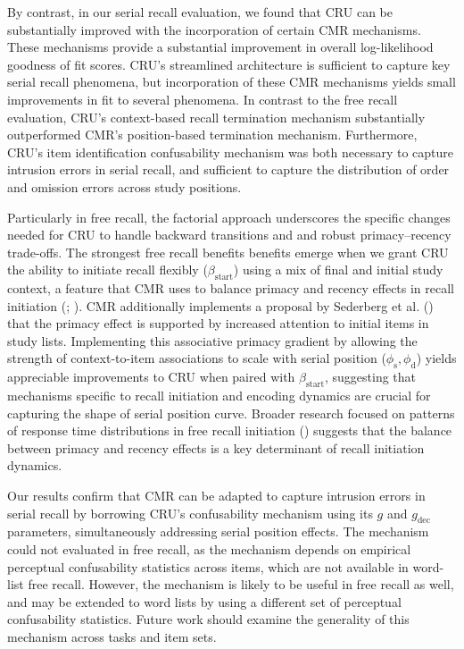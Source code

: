 \documentclass[
  man,
  floatsintext,
  longtable,
  nolmodern,
  notxfonts,
  notimes,
  draftfirst,
  colorlinks=true,linkcolor=blue,citecolor=blue,urlcolor=blue]{apa7}
\begin{document}
By contrast, in our serial recall evaluation, we found that CRU can be
substantially improved with the incorporation of certain CMR mechanisms.
These mechanisms provide a substantial improvement in overall
log-likelihood goodness of fit scores. CRU's streamlined architecture is
sufficient to capture key serial recall phenomena, but incorporation of
these CMR mechanisms yields small improvements in fit to several
phenomena. In contrast to the free recall evaluation, CRU's
context-based recall termination mechanism substantially outperformed
CMR's position-based termination mechanism. Furthermore, CRU's item
identification confusability mechanism was both necessary to capture
intrusion errors in serial recall, and sufficient to capture the
distribution of order and omission errors across study positions.

Particularly in free recall, the factorial approach underscores the
specific changes needed for CRU to handle backward transitions and and
robust primacy--recency trade-offs. The strongest free recall benefits
benefits emerge when we grant CRU the ability to initiate recall
flexibly (\(\beta_\text{start}\)) using a mix of final and initial study
context, a feature that CMR uses to balance primacy and recency effects
in recall initiation (; ). CMR
additionally implements a proposal by Sederberg et al.
() that the primacy effect is
supported by increased attention to initial items in study lists.
Implementing this associative primacy gradient by allowing the strength
of context-to-item associations to scale with serial position
(\(\phi_\text{s}, \phi_\text{d}\)) yields appreciable improvements to
CRU when paired with \(\beta_\text{start}\), suggesting that mechanisms
specific to recall initiation and encoding dynamics are crucial for
capturing the shape of serial position curve. Broader research focused
on patterns of response time distributions in free recall initiation
() suggests that the
balance between primacy and recency effects is a key determinant of
recall initiation dynamics.

Our results confirm that CMR can be adapted to capture intrusion errors
in serial recall by borrowing CRU's confusability mechanism using its
\(g\) and \(g_\text{dec}\) parameters, simultaneously addressing serial
position effects. The mechanism could not evaluated in free recall, as
the mechanism depends on empirical perceptual confusability statistics
across items, which are not available in word-list free recall. However,
the mechanism is likely to be useful in free recall as well, and may be
extended to word lists by using a different set of perceptual
confusability statistics. Future work should examine the generality of
this mechanism across tasks and item sets.
\end{document}
